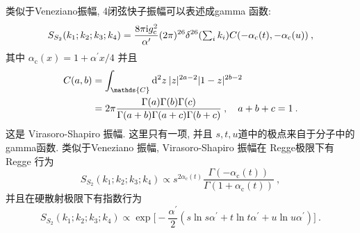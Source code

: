 类似于Veneziano振幅, 4闭弦快子振幅可以表述成gamma 函数:
\begin{equation}
	S_{S_{2}}(k_{1} ; k_{2} ; k_{3} ; k_{4})=\frac{8 \pi \mathrm{i} g_{\mathrm{c}}^{2}}{\alpha^{\prime}}(2 \pi)^{26} 
	\delta^{26}({\textstyle \sum_{i} k_{i}}) C(-\alpha_{\mathrm{c}}(t),-\alpha_{\mathrm{c}}(u)) \:, \label{6.6.10}
\end{equation}
其中 $\alpha_{\mathrm{c}}(x)=1+\alpha^{\prime} x / 4$ 并且
\begin{align}
	C(a, b) &=\int_{\mathds{C}} \dif^{2} z \: |z|^{2 a-2}|1-z|^{2 b-2} \nonumber \\
	&=2 \pi \frac{\Gamma(a) \Gamma(b) \Gamma(c)}{\Gamma(a+b) \Gamma(a+c) \Gamma(b+c)}\:, \quad a+b+c=1 \:. \label{6.6.11}
\end{align}
这是 Virasoro-Shapiro 振幅. 这里只有一项, 并且 $s, t, u$道中的极点来自于分子中的gamma函数. 类似于Veneziano 振幅,  Virasoro-Shapiro 振幅在 Regge极限下有Regge 行为
\begin{equation}
	S_{S_{2}}(k_{1} ; k_{2} ; k_{3} ; k_{4}) \propto s^{2 \alpha_{\mathrm{c}}(t)} 
	\frac{\Gamma(-\alpha_{\mathrm{c}}(t))}{\Gamma(1+\alpha_{\mathrm{c}}(t))} \:, \label{6.6.12}
\end{equation}
并且在硬散射极限下有指数行为
\begin{equation}
	S_{S_{2}}(k_{1} ; k_{2} ; k_{3} ; k_{4}) \propto \exp 
	\biggl[-\frac{\alpha^{\prime}}{2}(s \ln s \alpha^{\prime}+t \ln t \alpha^{\prime}+u \ln u \alpha^{\prime})\biggr] \:. \label{6.6.13}
\end{equation}

